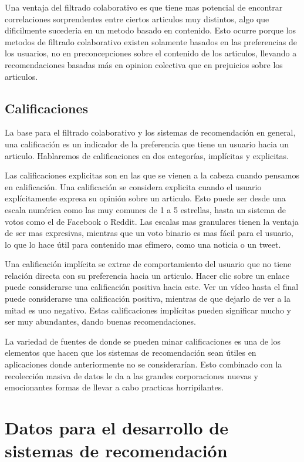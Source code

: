 \documentclass[11pt]{article}
\begin{document}
Una ventaja del filtrado colaborativo es que tiene mas potencial de encontrar
correlaciones sorprendentes entre ciertos articulos muy distintos, algo que
dificilmente sucederia en un metodo basado en contenido. Esto ocurre porque los
metodos de filtrado colaborativo existen solamente basados en las preferencias
de los usuarios, no en preconcepciones sobre el contenido de los articulos,
llevando a recomendaciones basadas más en opinion colectiva que en prejuicios
sobre los articulos.

\subsection{Calificaciones} %

La base para el filtrado colaborativo y los sistemas de recomendación en
general, una calificación es un indicador de la preferencia que tiene un usuario
hacia un articulo. Hablaremos de calificaciones en dos categorías, implícitas y
explicitas.

Las calificaciones explicitas son en las que se vienen a la cabeza cuando
pensamos en calificación. Una calificación se considera explicita cuando el
usuario explícitamente expresa su opinión sobre un articulo. Esto puede ser
desde una escala numérica como las muy comunes de 1 a 5 estrellas, hasta un
sistema de votos como el de Facebook o Reddit. Las escalas mas granulares tienen
la ventaja de ser mas expresivas, mientras que un voto binario es mas fácil para
el usuario, lo que lo hace útil para contenido mas efímero, como una noticia o
un tweet.

Una calificación implícita se extrae de comportamiento del usuario que no tiene
relación directa con su preferencia hacia un articulo. Hacer clic sobre un
enlace puede considerarse una calificación positiva hacia este. Ver un vídeo
hasta el final puede considerarse una calificación positiva, mientras de que
dejarlo de ver a la mitad es uno negativo. Estas calificaciones implícitas
pueden significar mucho y ser muy abundantes, dando buenas recomendaciones.

La variedad de fuentes de donde se pueden minar calificaciones es una de los
elementos que hacen que los sistemas de recomendación sean útiles en
aplicaciones donde anteriormente no se considerarían. Esto combinado con la
recolección masiva de datos le da a las grandes corporaciones nuevas y
emocionantes formas de llevar a cabo practicas horripilantes.


\section{Datos para el desarrollo de sistemas de recomendación}
\end{document}
